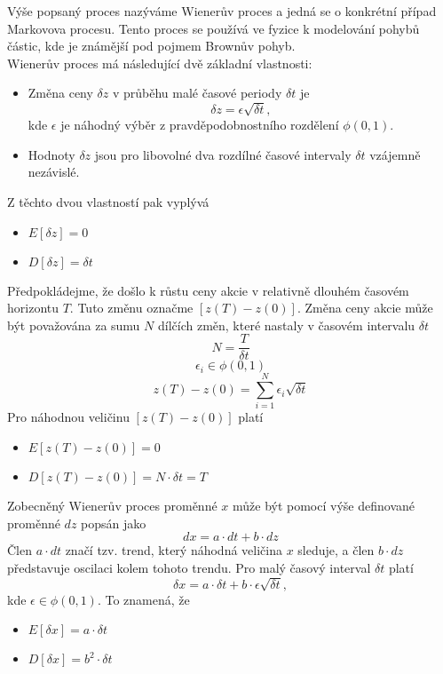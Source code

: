 \documentclass[a4paper]{book}
\begin{document}
Výše popsaný proces nazýváme Wienerův proces a jedná se o konkrétní případ Markovova procesu. Tento proces se používá ve fyzice k modelování pohybů částic, kde je známější pod pojmem Brownův pohyb.\\

\noindent Wienerův proces má následující dvě základní vlastnosti:
\begin{itemize}
\item Změna ceny $\delta z$ v průběhu malé časové periody $\delta t$ je
	\begin{equation*}
	\delta z = \epsilon \sqrt{\delta t},
	\end{equation*}
kde $\epsilon$ je náhodný výběr z pravděpodobnostního rozdělení $\phi(0,1)$.
\item Hodnoty $\delta z$ jsou pro libovolné dva rozdílné časové intervaly $\delta t$ vzájemně nezávislé.
\end{itemize}
Z těchto dvou vlastností pak vyplývá
\begin{itemize}
\item $E[\delta z] = 0$
\item $D[\delta z] = \delta t$
\end{itemize}

Předpokládejme, že došlo k růstu ceny akcie v relativně dlouhém časovém horizontu $T$. Tuto změnu označme $[z(T)-z(0)]$. Změna ceny akcie může být považována za sumu $N$ dílčích změn, které nastaly v časovém intervalu $\delta t$
\begin{equation*}
N = \frac{T}{\delta t}
\end{equation*}
\begin{equation*}
\epsilon_i \in \phi(0,1)
\end{equation*}
\begin{equation*}
z(T)-z(0) = \sum_{i = 1}^N \epsilon_i \sqrt{\delta t}
\end{equation*}
Pro náhodnou veličinu $[z(T)-z(0)]$ platí
\begin{itemize}
\item $E[z(T)-z(0)] = 0$
\item $D[z(T)-z(0)] = N \cdot \delta t = T$
\end{itemize}

Zobecněný Wienerův proces proměnné $x$ může být pomocí výše definované proměnné $d z$ popsán jako
\begin{equation*}
d x = a \cdot d t + b \cdot d z
\end{equation*}
Člen $a \cdot d t$ značí tzv. trend, který náhodná veličina $x$ sleduje, a člen $b \cdot d z$ představuje oscilaci kolem tohoto trendu. Pro malý časový interval $\delta t$ platí
\begin{equation*}
\delta x = a \cdot \delta t + b \cdot \epsilon \sqrt{\delta t},
\end{equation*}
kde $\epsilon \in \phi(0,1)$. To znamená, že
\begin{itemize}
\item $E[\delta x] = a \cdot \delta t$
\item $D[\delta x] = b^2 \cdot \delta t$
\end{itemize}
\end{document}
